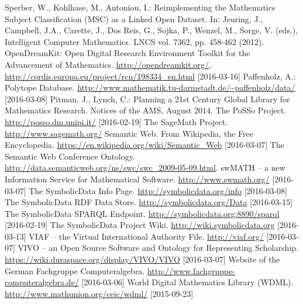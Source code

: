 \documentclass{llncs}
\newcommand{\SD}{{\sc Symbo\-lic\-Data}}
\begin{document}
\begin{thebibliography}{xxx}
  Sperber, W., Kohlhase, M., Antoniou, I.: Reimplementing the Mathematics
  Subject Classification (MSC) as a Linked Open Dataset.  In: Jeuring, J.,
  Campbell, J.A., Carette, J., Dos Reis, G., Sojka, P., Wenzel, M., Sorge,
  V. (eds.), Intelligent Computer Mathematics.  LNCS vol. 7362, pp. 458-462
  (2012).
 OpenDreamKit: Open Digital Research Environment Toolkit for the
  Advancement of Mathematics. \url{http://opendreamkit.org/},
  \url{http://cordis.europa.eu/project/rcn/198334_en.html} [2016-03-16]
 Paffenholz, A.: Polytope Database.
  \url{http://www.mathematik.tu-darmstadt.de/~paffenholz/data/}  [2016-03-08] 
 Pitman, J., Lynch, C.: Planning a 21st Century
  Global Library for Mathematics Research.  Notices of the AMS, August
  2014.
 The PoSSo Project. \url{http://posso.dm.unipi.it/}
  [2016-02-19]
 The SageMath Project.  \url{http://www.sagemath.org/}
 Semantic Web. From Wikipedia, the Free
  Encyclopedia. \url{https://en.wikipedia.org/wiki/Semantic_Web} [2016-03-07]
 The Semantic Web Conference Ontology.
  \url{http://data.semanticweb.org/ns/swc/swc_2009-05-09.html}. 
 swMATH -- a new Information Service for Mathematical Software.
  \url{http://www.swmath.org/} [2016-03-07]
 The {\SD} Info Page.  \url{http://symbolicdata.org/info}
  [2016-03-08]
 The {\SD} RDF Data Store.  \url{http://symbolicdata.org/Data}
  [2016-03-15]
 The {\SD} SPARQL Endpoint.
   \url{http://symbolicdata.org:8890/sparql} [2016-02-19]
 The {\SD} Project Wiki.
   \url{http://wiki.symbolicdata.org} [2016-03-13]
 VIAF -- the Virtual International Authority File.
  \url{http://viaf.org/} [2016-03-07]
 VIVO -- an Open Source Software and Ontology for Representing
  Scholarship.  \url{https://wiki.duraspace.org/display/VIVO/VIVO}
  [2016-03-07]
 Website of the German Fachgruppe Computeralgebra.   
  \url{http://www.fachgruppe-computeralgebra.de/} [2016-03-06]
 World Digital Mathematics Library (WDML).
  \url{http://www.mathunion.org/ceic/wdml/} [2015-09-23]

\end{thebibliography}
\end{document}
